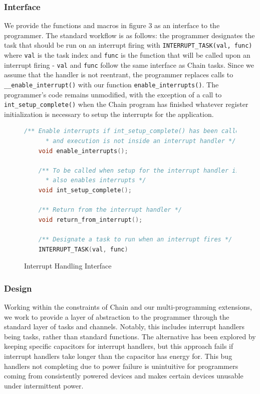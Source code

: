 \documentclass[11pt]{sensys-proc}
\newcommand{\chain}{Chain\xspace}
\begin{document}
\subsubsection{Interface}
We provide the functions and macros in figure 3 as an interface to
the programmer. The standard workflow is as follows: the programmer
designates the task that should be run on an interrupt firing
with \texttt{INTERRUPT\_TASK(val, func)} where \texttt{val} is the task
index and \texttt{func} is the function that will be called upon an
interrupt firing - \texttt{val} and \texttt{func} follow the same
interface as \chain tasks. Since we assume that the handler is not
reentrant, the programmer replaces calls to \texttt{\_\_enable\_interrupt()}
with our function \texttt{enable\_interrupts()}.
The programmer's code remains unmodified, with the exception of a call to
\texttt{int\_setup\_complete()} when the \chain program has finished whatever
register initialization is necessary to setup the interrupts for the
application.\\


\begin{figure}
\begin{minipage}[b]{1.0\textwidth}
\begin{lstlisting}[language=C]
    /** Enable interrupts if int_setup_complete() has been called
      * and execution is not inside an interrupt handler */
    void enable_interrupts();

    /** To be called when setup for the interrupt handler is complete,
      * also enables interrupts */
    void int_setup_complete();

    /** Return from the interrupt handler */
    void return_from_interrupt();

    /** Designate a task to run when an interrupt fires */
    INTERRUPT_TASK(val, func)
\end{lstlisting}
\caption{Interrupt Handling Interface}\label{label-a}
\end{minipage}\hfill
\end{figure}

\subsubsection{Design}
Working within the constraints of \chain and our multi-programming extensions,
we work to provide a layer of abstraction to the programmer through the standard
layer of tasks and channels. Notably, this includes interrupt handlers being
tasks, rather than standard functions. The alternative has been explored
by keeping specific capacitors for interrupt handlers\cite{Aware}, but this
approach fails if interrupt handlers take longer than the capacitor has
energy for. This bug handlers not completing due to power failure is
unintuitive for programmers coming from consistently powered devices and
makes certain devices unusable under intermittent power.
\end{document}
